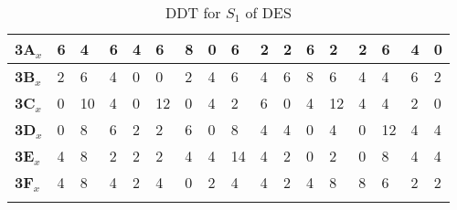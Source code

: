 \begin{longtable}[c]{|l|l|l|l|l|l|l|l|l|l|l|l|l|l|l|l|l|}
\textbf{3A}$_x$ & 6          & 4          & 6          & 4          & 6          & 8          & 0          & 6          & 2          & 2          & 6          & 2          & 2          & 6          & 4          & 0          \\ \hline
\textbf{3B}$_x$ & 2          & 6          & 4          & 0          & 0          & 2          & 4          & 6          & 4          & 6          & 8          & 6          & 4          & 4          & 6          & 2          \\ \hline
\textbf{3C}$_x$ & 0          & 10         & 4          & 0          & 12         & 0          & 4          & 2          & 6          & 0          & 4          & 12         & 4          & 4          & 2          & 0          \\ \hline
\textbf{3D}$_x$ & 0          & 8          & 6          & 2          & 2          & 6          & 0          & 8          & 4          & 4          & 0          & 4          & 0          & 12         & 4          & 4          \\ \hline
\textbf{3E}$_x$ & 4          & 8          & 2          & 2          & 2          & 4          & 4          & 14         & 4          & 2          & 0          & 2          & 0          & 8          & 4          & 4          \\ \hline
\textbf{3F}$_x$ & 4          & 8          & 4          & 2          & 4          & 0          & 2          & 4          & 4          & 2          & 4          & 8          & 8          & 6          & 2          & 2          \\ \hline
\caption{DDT for $S_1$ of DES}
\label{tab:ddt-s1-des}
\end{longtable}